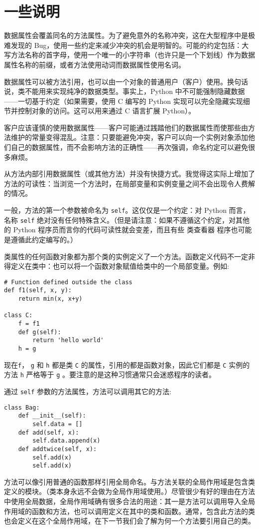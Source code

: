 \section{一些说明}
数据属性会覆盖同名的方法属性。为了避免意外的名称冲突，这在大型程序中是极难发现的 Bug，使用一些约定来减少冲突的机会是明智的。可能的约定包括：大写方法名称的首字母，使用一个唯一的小字符串（也许只是一个下划线）作为数据属性名称的前缀，或者方法使用动词而数据属性使用名词。

数据属性可以被方法引用，也可以由一个对象的普通用户（客户）使用。换句话说，类不能用来实现纯净的数据类型。事实上，Python 中不可能强制隐藏数据——一切基于约定（如果需要，使用 C 编写的 Python 实现可以完全隐藏实现细节并控制对象的访问。这可以用来通过 C 语言扩展 Python）。

客户应该谨慎的使用数据属性——客户可能通过践踏他们的数据属性而使那些由方法维护的常量变得混乱。注意：只要能避免冲突，客户可以向一个实例对象添加他们自己的数据属性，而不会影响方法的正确性——再次强调，命名约定可以避免很多麻烦。

从方法内部引用数据属性（或其他方法）并没有快捷方式。我觉得这实际上增加了方法的可读性：当浏览一个方法时，在局部变量和实例变量之间不会出现令人费解的情况。

一般，方法的第一个参数被命名为 \texttt{self}。这仅仅是一个约定：对 Python 而言，名称 \texttt{self} 绝对没有任何特殊含义。（但是请注意：如果不遵循这个约定，对其他的 Python 程序员而言你的代码可读性就会变差，而且有些 类查看器 程序也可能是遵循此约定编写的。）

类属性的任何函数对象都为那个类的实例定义了一个方法。函数定义代码不一定非得定义在类中：也可以将一个函数对象赋值给类中的一个局部变量。例如:
\begin{lstlisting}
# Function defined outside the class
def f1(self, x, y):
    return min(x, x+y)

class C:
    f = f1
    def g(self):
        return 'hello world'
    h = g
\end{lstlisting}
现在\verb|f|， \verb|g| 和 \verb|h| 都是类 \verb|C| 的属性，引用的都是函数对象，因此它们都是 \verb|C| 实例的方法 \verb|h| 严格等于 \verb|g| 。要注意的是这种习惯通常只会迷惑程序的读者。

通过 \texttt{self} 参数的方法属性，方法可以调用其它的方法:
\begin{lstlisting}
class Bag:
    def __init__(self):
        self.data = []
    def add(self, x):
        self.data.append(x)
    def addtwice(self, x):
        self.add(x)
        self.add(x)
\end{lstlisting}
方法可以像引用普通的函数那样引用全局命名。与方法关联的全局作用域是包含类定义的模块。（类本身永远不会做为全局作用域使用。）尽管很少有好的理由在方法 中使用全局数据，全局作用域确有很多合法的用途：其一是方法可以调用导入全局作用域的函数和方法，也可以调用定义在其中的类和函数。通常，包含此方法的类也会定义在这个全局作用域，在下一节我们会了解为何一个方法要引用自己的类。

